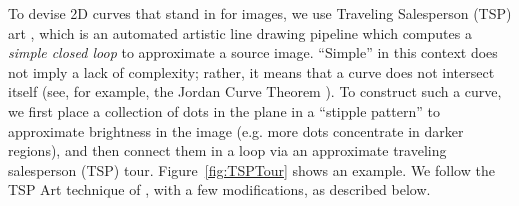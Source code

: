 \documentclass[runningheads]{llncs}
\begin{document}
To devise 2D curves that stand in for images, we use Traveling Salesperson (TSP) art \cite{bosch2004continuous, kaplan2005tsp,bosch2008connecting}, which is an automated artistic line drawing pipeline which computes a {\em simple closed loop} to approximate a source image.  ``Simple'' in this context does not imply a lack of complexity; rather, it means that a curve does not intersect itself (see, for example, the Jordan Curve Theorem \cite{bosch2009jordan}).  To construct such a curve, we first place a collection of dots in the plane in a ``stipple pattern'' to approximate brightness in the image (e.g. more dots concentrate in darker regions), and then connect them in a loop via an approximate traveling salesperson (TSP) tour.  Figure~\ref{fig:TSPTour} shows an example.  We follow the TSP Art technique of \cite{kaplan2005tsp}, with a few modifications, as described below.


\end{document}

